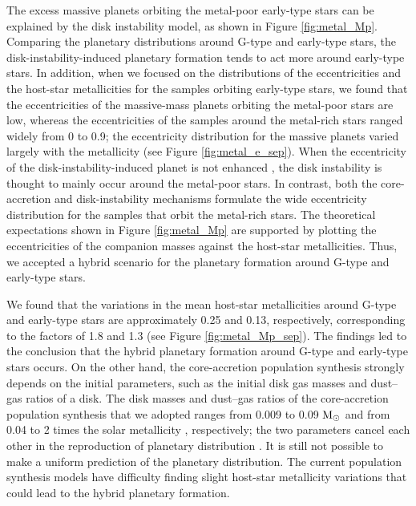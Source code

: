 \documentclass[twocolumn]{aastex62}
\begin{document}
\begin{CJK*}{UTF8}{min}
The excess massive planets orbiting the metal-poor early-type stars can be explained by the disk instability model, as shown in Figure \ref{fig:metal_Mp}. Comparing the planetary distributions around G-type and early-type stars, the disk-instability-induced planetary formation tends to act more around early-type stars. In addition, when we focused on the distributions of the eccentricities and the host-star metallicities for the samples orbiting early-type stars, we found that the eccentricities of the massive-mass planets orbiting the metal-poor stars are low, whereas the eccentricities of the samples around the metal-rich stars ranged widely from 0 to 0.9; the eccentricity distribution for the massive planets varied largely with the metallicity (see Figure \ref{fig:metal_e_sep}). When the eccentricity of the disk-instability-induced planet is not enhanced \citep{2004ApJ...609.1045M, 2010Wiley, 2011ApJ...731...74B}, the disk instability is thought to mainly occur around the metal-poor stars. In contrast, both the core-accretion and disk-instability mechanisms formulate the wide eccentricity distribution for the samples that orbit the metal-rich stars. The theoretical expectations shown in Figure \ref{fig:metal_Mp} are supported by plotting the eccentricities of the companion masses against the host-star metallicities. Thus, we accepted a hybrid scenario for the planetary formation around G-type and early-type stars.

We found that the variations in the mean host-star metallicities around G-type and early-type stars are approximately 0.25 and 0.13, respectively, corresponding to the factors of 1.8 and 1.3 (see Figure \ref{fig:metal_Mp_sep}). The findings led to the conclusion that the hybrid planetary formation around G-type and early-type stars occurs. On the other hand, the core-accretion population synthesis \citep[e.g.,][]{2004ApJ...604..388I, 2009A&A...501.1139M} strongly depends on the initial parameters, such as the initial disk gas masses and dust--gas ratios of a disk. The disk masses and dust--gas ratios of the core-accretion population synthesis that we adopted ranges from 0.009 to 0.09 $\rm M_{\odot}$ and from 0.04 to 2 times the solar metallicity \citep{2009A&A...501.1139M}, respectively; the two parameters cancel each other in the reproduction of planetary distribution \citep{2012A&A...541A..97M}. It is still not possible to make a uniform prediction of the planetary distribution. The current population synthesis models have difficulty finding slight host-star metallicity variations that could lead to the hybrid planetary formation.


\end{CJK*}
\end{document}
